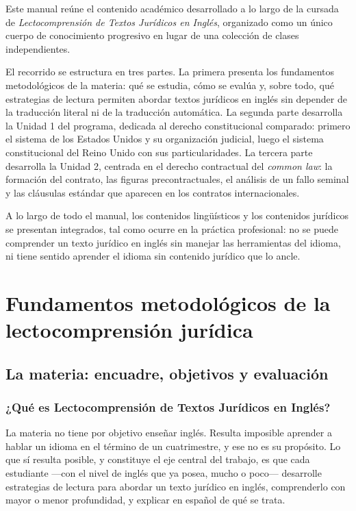 \documentclass[12pt,oneside]{book}
\begin{document}
Este manual reúne el contenido académico desarrollado a lo largo de la cursada de \textit{Lectocomprensión de Textos Jurídicos en Inglés}, organizado como un único cuerpo de conocimiento progresivo en lugar de una colección de clases independientes.

El recorrido se estructura en tres partes. La primera presenta los fundamentos metodológicos de la materia: qué se estudia, cómo se evalúa y, sobre todo, qué estrategias de lectura permiten abordar textos jurídicos en inglés sin depender de la traducción literal ni de la traducción automática. La segunda parte desarrolla la Unidad 1 del programa, dedicada al derecho constitucional comparado: primero el sistema de los Estados Unidos y su organización judicial, luego el sistema constitucional del Reino Unido con sus particularidades. La tercera parte desarrolla la Unidad 2, centrada en el derecho contractual del \textit{common law}: la formación del contrato, las figuras precontractuales, el análisis de un fallo seminal y las cláusulas estándar que aparecen en los contratos internacionales.

A lo largo de todo el manual, los contenidos lingüísticos y los contenidos jurídicos se presentan integrados, tal como ocurre en la práctica profesional: no se puede comprender un texto jurídico en inglés sin manejar las herramientas del idioma, ni tiene sentido aprender el idioma sin contenido jurídico que lo ancle.

\part{Fundamentos metodológicos de la lectocomprensión jurídica}

\chapter{La materia: encuadre, objetivos y evaluación}

\section{¿Qué es Lectocomprensión de Textos Jurídicos en Inglés?}

La materia no tiene por objetivo enseñar inglés. Resulta imposible aprender a hablar un idioma en el término de un cuatrimestre, y ese no es su propósito. Lo que sí resulta posible, y constituye el eje central del trabajo, es que cada estudiante ---con el nivel de inglés que ya posea, mucho o poco--- desarrolle estrategias de lectura para abordar un texto jurídico en inglés, comprenderlo con mayor o menor profundidad, y explicar en español de qué se trata.
\end{document}

